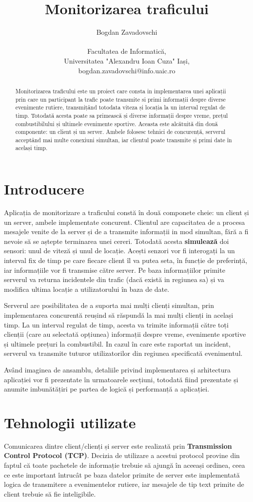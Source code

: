 \documentclass{article}
\author{Bogdan Zavadovschi \protect\\ 
\protect\\
\small Facultatea de Informatică, 
\protect\\
\small Universitatea "Alexandru Ioan Cuza" Iași,
\protect\\ 
\small bogdan.zavadovschi@info.uaic.ro}
\title{
    \textbf{Monitorizarea traficului} 
}
\date{}
\begin{document}
\maketitle
\begin{abstract}
    Monitorizarea traficului este un proiect care consta in implementarea unei aplicații prin care un participant la trafic poate transmite si primi informații despre diverse evenimente rutiere, transmițând totodata viteza și locația la un interval regulat de timp. Totodată acesta poate sa primească și diverse informații despre vreme, prețul combustibilului și ultimele evenimente sportive. Aceasta este alcătuită din două componente: un client și un server. Ambele folosesc tehnici de concurență, serverul acceptând mai multe conexiuni simultan, iar clientul poate transmite și primi date în același timp.
\end{abstract}
\section{Introducere}
Aplicația de monitorizare a traficului constă în două componete cheie: un client și un server, ambele implementate concurent. Clientul are capacitatea de a procesa mesajele venite de la server și de a transmite informații in mod simultan, fără a fi nevoie să se aștepte terminarea unei cereri. Totodată acesta \textbf{simulează} doi sensori: unul de viteză și unul de locație. Acești senzori vor fi interogați la un interval fix de timp pe care fiecare client îl va putea seta, în funcție de preferință, iar informațiile vor fi transmise către server. Pe baza informațiilor primite serverul va returna incidentele din trafic (dacă există in regiunea sa) și va modifica ultima locație a utilizatorului în baza de date.

Serverul are posibilitatea de a suporta mai mulți clienți simultan, prin implementarea concurentă reușind să răspundă la mai mulți clienți in același timp. La un interval regulat de timp, acesta va trimite informații către toți clienții (care au selectată opțiunea) informații despre vreme, evenimente sportive și ultimele prețuri la combustibil. In cazul în care este raportat un incident, serverul va transmite tuturor utilizatorilor din regiunea specificată evenimentul.   

Având imaginea de ansamblu, detaliile privind implementarea și arhitectura aplicației vor fi prezentate în urmatoarele secțiuni, totodată fiind prezentate și anumite imbunătățiri pe partea de logică și performanță a aplicației. 
\section{Tehnologii utilizate}
Comunicarea dintre client/clienți și server este realizată prin  \textbf{Transmission Control Protocol (TCP)}. Decizia de utilizare a acestui protocol provine din faptul că toate pachetele de informație trebuie să ajungă în aceeași ordinea, ceea ce este important întrucât pe baza datelor primite de server este implementată logica de transmitere a evenimentelor rutiere, iar  mesajele de tip text primite de client trebuie să fie inteligibile. 
\end{document}
